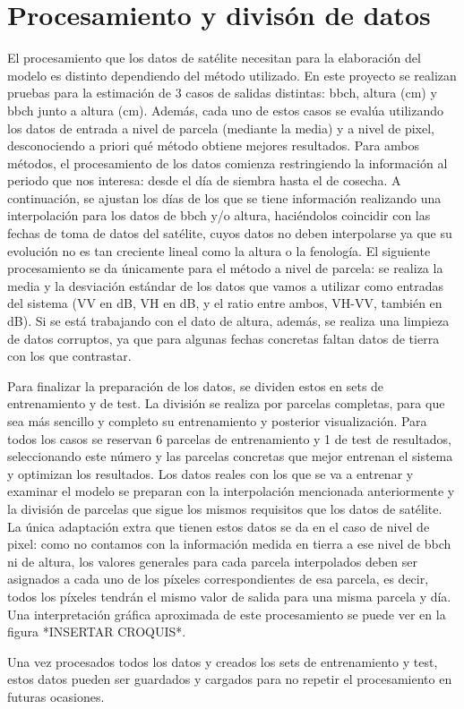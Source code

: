 \section{Procesamiento y divisón de datos}
\par  El procesamiento que los datos de satélite necesitan para la elaboración del modelo es distinto dependiendo del método utilizado. En este proyecto se realizan pruebas para la estimación de 3 casos de salidas distintas: \gls{bbch}, altura (cm) y \gls{bbch} junto a altura (cm). Además, cada uno de estos casos se evalúa utilizando los datos de entrada a nivel de parcela (mediante la media) y a nivel de pixel, desconociendo a priori qué método obtiene mejores resultados. Para ambos métodos, el procesamiento de los datos comienza restringiendo la información al periodo que nos interesa: desde el día de siembra hasta el de cosecha. A continuación, se ajustan los días de los que se tiene información realizando una interpolación para los datos de \gls{bbch} y/o altura, haciéndolos coincidir con las fechas de toma de datos del satélite, cuyos datos no deben interpolarse ya que su evolución no es tan creciente lineal como la altura o la fenología. El siguiente procesamiento se da únicamente para el método a nivel de parcela: se realiza la media y la desviación estándar de los datos que vamos a utilizar como entradas del sistema (VV en dB, VH en dB, y el ratio entre ambos, VH-VV, también en dB). Si se está trabajando con el dato de altura, además, se realiza una limpieza de datos corruptos, ya que para algunas fechas concretas faltan datos de tierra con los que contrastar. 
\\
\par Para finalizar la preparación de los datos, se dividen estos en sets de entrenamiento y de test. La división se realiza por parcelas completas, para que sea más sencillo y completo su entrenamiento y posterior visualización. Para todos los casos se reservan 6 parcelas de entrenamiento y 1 de test de resultados, seleccionando este número y las parcelas concretas que mejor entrenan el sistema y optimizan los resultados. Los datos reales con los que se va a entrenar y examinar el modelo se preparan con la interpolación mencionada anteriormente y la división de parcelas que sigue los mismos requisitos que los datos de satélite. La única adaptación extra que tienen estos datos se da en el caso de nivel de pixel: como no contamos con la información medida en tierra a ese nivel de \gls{bbch} ni de altura, los valores generales para cada parcela interpolados deben ser asignados a cada uno de los píxeles correspondientes de esa parcela, es decir, todos los píxeles tendrán el mismo valor de salida para una misma parcela y día. Una interpretación gráfica aproximada de este procesamiento se puede ver en la figura *INSERTAR CROQUIS*.
\\
\par Una vez procesados todos los datos y creados los sets de entrenamiento y test, estos datos pueden ser guardados y cargados para no repetir el procesamiento en futuras ocasiones.
